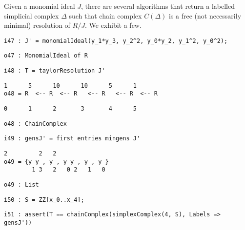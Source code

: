 \documentclass[12pt,leqno]{amsart}
\theoremstyle{definition}
\begin{document}
Given a monomial ideal $J$, there are several algorithms that return a labelled
simplicial complex $\Delta$ such that chain complex $C(\Delta)$ is a free (not
necessarily minimal) resolution of $R/J$.  We exhibit a few.
\begin{lstlisting}[xleftmargin=10pt, aboveskip=3.0pt, belowskip=1.5pt]
i47 : J' = monomialIdeal(y_1*y_3, y_2^2, y_0*y_2, y_1^2, y_0^2);
\end{lstlisting}
\begin{lstlisting}[xleftmargin=10pt, aboveskip=1.5pt, belowskip=1.5pt]
o47 : MonomialIdeal of R
\end{lstlisting}
\begin{lstlisting}[xleftmargin=10pt, aboveskip=1.5pt, belowskip=1.5pt]
i48 : T = taylorResolution J'
\end{lstlisting}
\begin{lstlisting}[xleftmargin=10pt, lineskip=-10pt, aboveskip=1.5pt, belowskip=1.5pt]
       1      5      10      10      5      1
o48 = R  <-- R  <-- R   <-- R   <-- R  <-- R
\end{lstlisting}
\begin{lstlisting}[xleftmargin=10pt, aboveskip=1.5pt, belowskip=1.5pt] 
      0      1      2       3       4      5
\end{lstlisting}
\begin{lstlisting}[xleftmargin=10pt, aboveskip=1.5pt, belowskip=1.5pt]
o48 : ChainComplex
\end{lstlisting}
\begin{lstlisting}[xleftmargin=10pt, aboveskip=1.5pt, belowskip=1.5pt]
i49 : gensJ' = first entries mingens J'
\end{lstlisting}
\begin{lstlisting}[xleftmargin=10pt, lineskip=-10pt, aboveskip=1.5pt, belowskip=1.5pt]
              2         2   2
o49 = {y y , y , y y , y , y }
        1 3   2   0 2   1   0
\end{lstlisting}
\begin{lstlisting}[xleftmargin=10pt, aboveskip=1.5pt, belowskip=1.5pt]
o49 : List
\end{lstlisting}
\begin{lstlisting}[xleftmargin=10pt, aboveskip=1.5pt, belowskip=1.5pt]
i50 : S = ZZ[x_0..x_4];
\end{lstlisting}
\begin{lstlisting}[xleftmargin=10pt, aboveskip=1.5pt, belowskip=1.5pt]
i51 : assert(T == chainComplex(simplexComplex(4, S), Labels => gensJ'))
\end{lstlisting}
\end{document}
